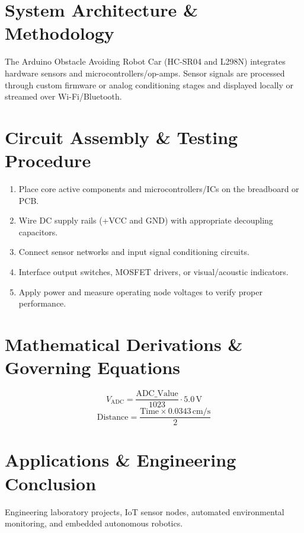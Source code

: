 \documentclass[11pt,a4paper]{article}
\begin{document}
\section{System Architecture \& Methodology}
The Arduino Obstacle Avoiding Robot Car (HC-SR04 and L298N) integrates hardware sensors and microcontrollers/op-amps. Sensor signals are processed through custom firmware or analog conditioning stages and displayed locally or streamed over Wi-Fi/Bluetooth.

\section{Circuit Assembly \& Testing Procedure}
\begin{enumerate}
    \item Place core active components and microcontrollers/ICs on the breadboard or PCB.
    \item Wire DC supply rails (+VCC and GND) with appropriate decoupling capacitors.
    \item Connect sensor networks and input signal conditioning circuits.
    \item Interface output switches, MOSFET drivers, or visual/acoustic indicators.
    \item Apply power and measure operating node voltages to verify proper performance.
\end{enumerate}

\section{Mathematical Derivations \& Governing Equations}
\begin{equation}
V_{\text{ADC}} = \frac{\text{ADC\_Value}}{1023} \cdot 5.0\,\text{V}
\end{equation}
\begin{equation}
\text{Distance} = \frac{\text{Time} \times 0.0343\,\text{cm/s}}{2}
\end{equation}

\section{Applications \& Engineering Conclusion}
Engineering laboratory projects, IoT sensor nodes, automated environmental monitoring, and embedded autonomous robotics.
\end{document}

